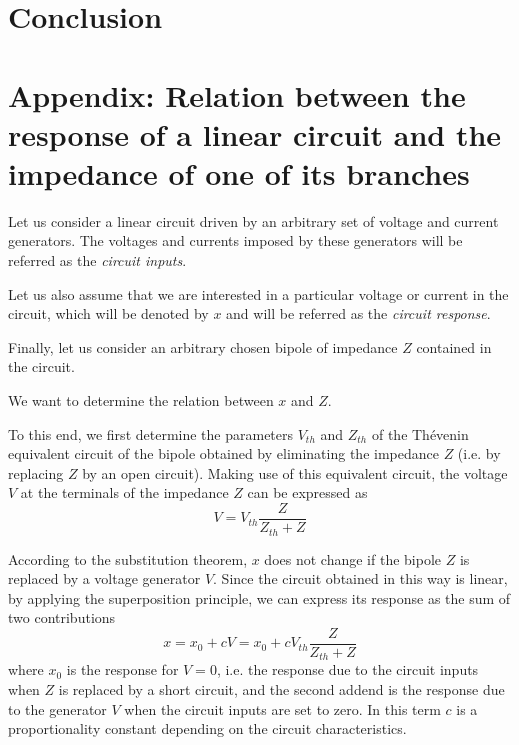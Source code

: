 \documentclass[journal]{IEEEtran}
\begin{document}
\section{Conclusion}


\section{Appendix: Relation between the response of a linear circuit and the impedance of one of its branches}
Let us consider a linear circuit driven by an arbitrary set of voltage and current generators. The voltages and currents imposed by these generators will be referred as the \emph{circuit inputs}.

Let us also assume that we are interested in a particular voltage or current in the circuit, which will be denoted by $x$ and will be referred as the \emph{circuit response}.

Finally, let us consider an arbitrary chosen bipole of impedance $Z$ contained in the circuit.

We want to determine the relation between $x$ and $Z$.

To this end, we first determine the parameters $V_{th}$ and $Z_{th}$ of the Th\'evenin equivalent circuit of the bipole obtained by eliminating  the impedance $Z$ (i.e. by replacing $Z$ by an open circuit). Making use of this equivalent circuit, the voltage $V$ at the terminals of the impedance $Z$ can be expressed as
\begin{equation}
V = V_{th}\frac{Z}{Z_{th}+Z}
\label{eq:VZ}
\end{equation}

According to the substitution theorem, $x$ does not change if the bipole $Z$ is replaced by a voltage generator $V$.
Since the circuit obtained in this way is linear, by applying the superposition principle, we can express its response as the sum of two contributions
\begin{equation}
x = x_{0} + cV = x_{0} + c V_{th}\frac{Z}{Z_{th}+Z}
\label{eq:x1}
\end{equation}
where $x_{0}$ is the response for $V = 0$, i.e. the response due to the circuit inputs when $Z$ is replaced by a short circuit, and the second addend is the response due to the generator $V$ when the circuit inputs are set to zero. In this term $c$ is a proportionality constant depending on the circuit characteristics.
\end{document}

